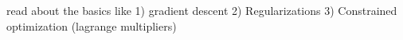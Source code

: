 read about the basics like 
1) gradient descent 
2) Regularizations
3) Constrained optimization (lagrange multipliers)




